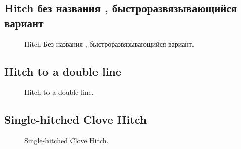 \subsection{Hitch без названия , быстроразвязывающийся вариант}

\begin{figure}[H]\centering
	\begin{minipage}{1\linewidth}
		\begin{center}
			\tcbox[enhanced jigsaw,colframe=black,opacityframe=0.5,opacityback=0.5]
			{\centering{}}
		\end{center}
	\end{minipage}
\caption{Hitch Без названия , быстроразвязывающийся вариант.}
\label{ris:Hitch_noname_slipped}
\end{figure}

\subsection{Hitch to a double line}

\begin{figure}[H]\centering
	\begin{minipage}{1\linewidth}
		\begin{center}
			\tcbox[enhanced jigsaw,colframe=black,opacityframe=0.5,opacityback=0.5]
			{\centering{}}
		\end{center}
	\end{minipage}
\caption{Hitch to a double line.}
\label{ris:Hitch_to_a_double_line}
\end{figure}

\subsection{Single-hitched Clove Hitch}

\begin{figure}[H]\centering
\hfil
	\caption{Single-hitched Clove Hitch.}\label{ris:single-hitched_Clove_Hitch}
\end{figure}


